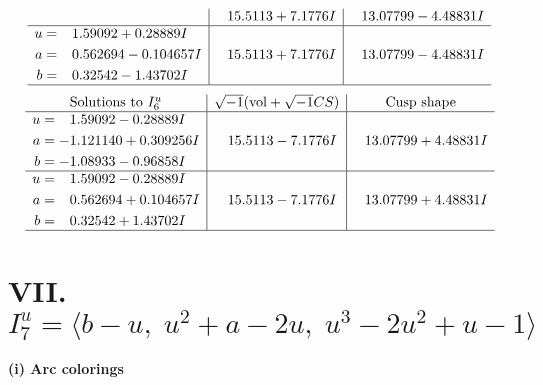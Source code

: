 \documentclass[1p]{elsarticle_modified}
\theoremstyle{definition}
\newcommand{\I}{\sqrt{-1}}
\begin{document}
$$\begin{array}{c|c|c}
 & \phantom{-}15.5113 + 7.1776 I & \phantom{-}13.07799 - 4.48831 I \\ \hline\begin{aligned}
u &= \phantom{-}1.59092 + 0.28889 I \\
a &= \phantom{-}0.562694 - 0.104657 I \\
b &= \phantom{-}0.32542 - 1.43702 I\end{aligned}
 & \phantom{-}15.5113 + 7.1776 I & \phantom{-}13.07799 - 4.48831 I\\
 \hline 
 \end{array}$$\newpage$$\begin{array}{c|c|c}  
\text{Solutions to }I^u_{6}& \I (\text{vol} + \sqrt{-1}CS) & \text{Cusp shape}\\
 \hline 
\begin{aligned}
u &= \phantom{-}1.59092 - 0.28889 I \\
a &= -1.121140 + 0.309256 I \\
b &= -1.08933 - 0.96858 I\end{aligned}
 & \phantom{-}15.5113 - 7.1776 I & \phantom{-}13.07799 + 4.48831 I \\ \hline\begin{aligned}
u &= \phantom{-}1.59092 - 0.28889 I \\
a &= \phantom{-}0.562694 + 0.104657 I \\
b &= \phantom{-}0.32542 + 1.43702 I\end{aligned}
 & \phantom{-}15.5113 - 7.1776 I & \phantom{-}13.07799 + 4.48831 I\\
 \hline 
 \end{array}$$\newpage\newpage\renewcommand{\arraystretch}{1}
\centering \section*{VII. $I^u_{7}= \langle b- u,\;u^2+a-2 u,\;u^3-2 u^2+u-1 \rangle$}
\flushleft \textbf{(i) Arc colorings}\\
\end{document}
